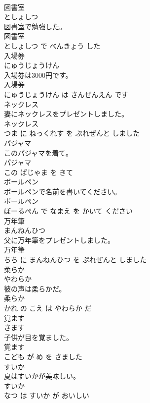 \documentclass[8pt]{extreport}
\begin{document}
\begin{CJK}{UTF8}{min}
\\	図書室	
\\	としょしつ			
\\	図書室で勉強した。	
\\	図書室 
\\	としょしつ で べんきょう した			
\\	入場券	
\\	にゅうじょうけん			
\\	入場券は3000円です。	
\\	入場券 
\\	にゅうじょうけん は さんぜんえん です			
\\	ネックレス	
\\	妻にネックレスをプレゼントしました。	
\\	ネックレス 
\\	つま に ねっくれす を ぷれぜんと しました			
\\	パジャマ	
\\	このパジャマを着て。	
\\	パジャマ 
\\	この ぱじゃま を きて			
\\	ボールペン	
\\	ボールペンで名前を書いてください。	
\\	ボールペン 
\\	ぼーるぺん で なまえ を かいて ください			
\\	万年筆	
\\	まんねんひつ			
\\	父に万年筆をプレゼントしました。	
\\	万年筆 
\\	ちち に まんねんひつ を ぷれぜんと しました			
\\	柔らか	
\\	やわらか			
\\	彼の声は柔らかだ。	
\\	柔らか 
\\	かれ の こえ は やわらか だ			
\\	覚ます	
\\	さます			
\\	子供が目を覚ました。	
\\	覚ます 
\\	こども が め を さました			
\\	すいか	
\\	夏はすいかが美味しい。	
\\	すいか 
\\	なつ は すいか が おいしい			

\end{CJK}
\end{document}
